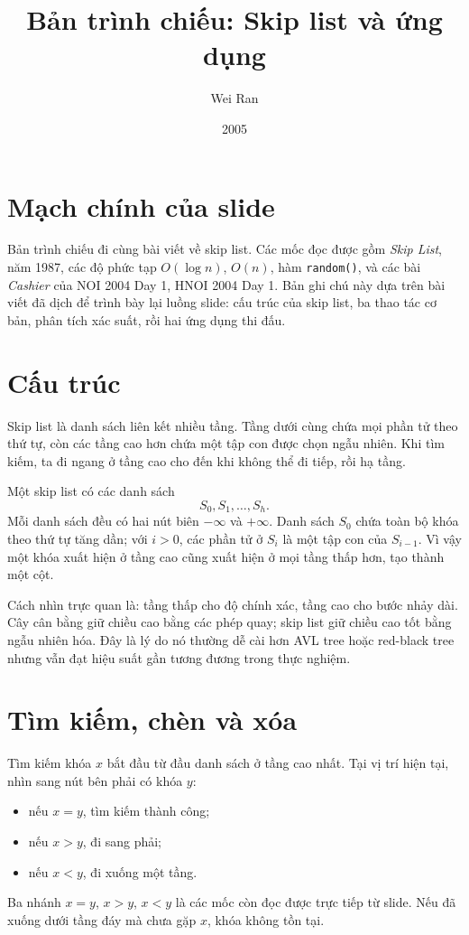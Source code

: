 \documentclass[11pt]{article}
\title{Bản trình chiếu: Skip list và ứng dụng}
\author{Wei Ran}
\date{2005}
\begin{document}
\maketitle


\section{Mạch chính của slide}

Bản trình chiếu đi cùng bài viết về skip list. Các mốc đọc được gồm
\textit{Skip List}, năm 1987, các độ phức tạp \(O(\log n)\), \(O(n)\), hàm
\texttt{random()}, và các bài \textit{Cashier} của NOI 2004 Day 1,
HNOI 2004 Day 1. Bản ghi chú này dựa trên bài viết đã dịch để trình bày lại
luồng slide: cấu trúc của skip list, ba thao tác cơ bản, phân tích xác suất,
rồi hai ứng dụng thi đấu.

\section{Cấu trúc}

Skip list là danh sách liên kết nhiều tầng. Tầng dưới cùng chứa mọi phần tử
theo thứ tự, còn các tầng cao hơn chứa một tập con được chọn ngẫu nhiên. Khi
tìm kiếm, ta đi ngang ở tầng cao cho đến khi không thể đi tiếp, rồi hạ tầng.

Một skip list có các danh sách
\[
  S_0,S_1,\ldots,S_h.
\]
Mỗi danh sách đều có hai nút biên \(-\infty\) và \(+\infty\). Danh sách
\(S_0\) chứa toàn bộ khóa theo thứ tự tăng dần; với \(i>0\), các phần tử ở
\(S_i\) là một tập con của \(S_{i-1}\). Vì vậy một khóa xuất hiện ở tầng cao
cũng xuất hiện ở mọi tầng thấp hơn, tạo thành một cột.

Cách nhìn trực quan là: tầng thấp cho độ chính xác, tầng cao cho bước nhảy
dài. Cây cân bằng giữ chiều cao bằng các phép quay; skip list giữ chiều cao
tốt bằng ngẫu nhiên hóa. Đây là lý do nó thường dễ cài hơn AVL tree hoặc
red-black tree nhưng vẫn đạt hiệu suất gần tương đương trong thực nghiệm.

\section{Tìm kiếm, chèn và xóa}

Tìm kiếm khóa \(x\) bắt đầu từ đầu danh sách ở tầng cao nhất. Tại vị trí hiện
tại, nhìn sang nút bên phải có khóa \(y\):
\begin{itemize}
  \item nếu \(x=y\), tìm kiếm thành công;
  \item nếu \(x>y\), đi sang phải;
  \item nếu \(x<y\), đi xuống một tầng.
\end{itemize}
Ba nhánh \(x=y\), \(x>y\), \(x<y\) là các mốc còn đọc được trực tiếp từ
slide. Nếu đã xuống dưới tầng đáy mà chưa gặp \(x\), khóa không tồn tại.
\end{document}
